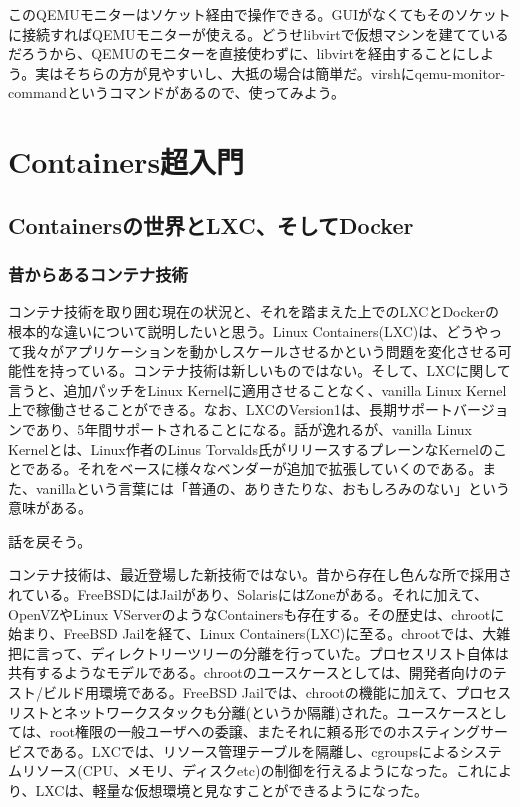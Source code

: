 \documentclass[9pt,b5paper,tombo]{jsbook}
\begin{document}
このQEMUモニターはソケット経由で操作できる。GUIがなくてもそのソケットに接続すればQEMUモニターが使える。どうせlibvirtで仮想マシンを建てているだろうから、QEMUのモニターを直接使わずに、libvirtを経由することにしよう。実はそちらの方が見やすいし、大抵の場合は簡単だ。virshにqemu-monitor-commandというコマンドがあるので、使ってみよう。

\chapter{Containers超入門}

\section{Containersの世界とLXC、そしてDocker}

\subsection{昔からあるコンテナ技術}
コンテナ技術を取り囲む現在の状況と、それを踏まえた上でのLXCとDockerの根本的な違いについて説明したいと思う。Linux Containers(LXC)は、どうやって我々がアプリケーションを動かしスケールさせるかという問題を変化させる可能性を持っている。コンテナ技術は新しいものではない。そして、LXCに関して言うと、追加パッチをLinux Kernelに適用させることなく、vanilla Linux Kernel上で稼働させることができる。なお、LXCのVersion1は、長期サポートバージョンであり、5年間サポートされることになる。話が逸れるが、vanilla Linux Kernelとは、Linux作者のLinus Torvalds氏がリリースするプレーンなKernelのことである。それをベースに様々なベンダーが追加で拡張していくのである。また、vanillaという言葉には「普通の、ありきたりな、おもしろみのない」という意味がある。

\noindent
話を戻そう。

コンテナ技術は、最近登場した新技術ではない。昔から存在し色んな所で採用されている。FreeBSDにはJailがあり、SolarisにはZoneがある。それに加えて、OpenVZやLinux VServerのようなContainersも存在する。その歴史は、chrootに始まり、FreeBSD Jailを経て、Linux Containers(LXC)に至る。chrootでは、大雑把に言って、ディレクトリーツリーの分離を行っていた。プロセスリスト自体は共有するようなモデルである。chrootのユースケースとしては、開発者向けのテスト/ビルド用環境である。FreeBSD Jailでは、chrootの機能に加えて、プロセスリストとネットワークスタックも分離(というか隔離)された。ユースケースとしては、root権限の一般ユーザへの委譲、またそれに頼る形でのホスティングサービスである。LXCでは、リソース管理テーブルを隔離し、cgroupsによるシステムリソース(CPU、メモリ、ディスクetc)の制御を行えるようになった。これにより、LXCは、軽量な仮想環境と見なすことができるようになった。
\end{document}
